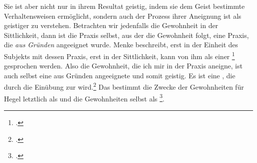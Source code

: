\documentclass[12pt, a4paper, openany]{report}
\begin{document}
Sie ist aber nicht nur in ihrem Resultat geistig, indem sie dem Geist bestimmte Verhaltensweisen ermöglicht, sondern auch der Prozess ihrer Aneignung ist als geistiger zu verstehen.
Betrachten wir jedenfalls die Gewohnheit in der Sittlichkeit, dann ist die Praxis selbst, aus der die Gewohnheit folgt, eine Praxis, die \emph{aus Gründen} angeeignet wurde.
Menke beschreibt, erst in der Einheit des Subjekts mit dessen Praxis, erst in der Sittlichkeit, kann von ihm als einer \footcite[][29]{menke_autonomie_2018} gesprochen werden.
Also die Gewohnheit, die ich mir in der Praxis aneigne, ist auch selbst eine aus Gründen angeeignete und somit geistig. 
Es ist eine , die durch die Einübung zur  wird.\footcite[][414]{khurana_freiheit_2017}
Das bestimmt die Zwecke der Gewohnheiten für Hegel letztlich als  und die Gewohnheiten selbst als \footcite[][131]{menke_autonomie_2018}.\\
\end{document}

